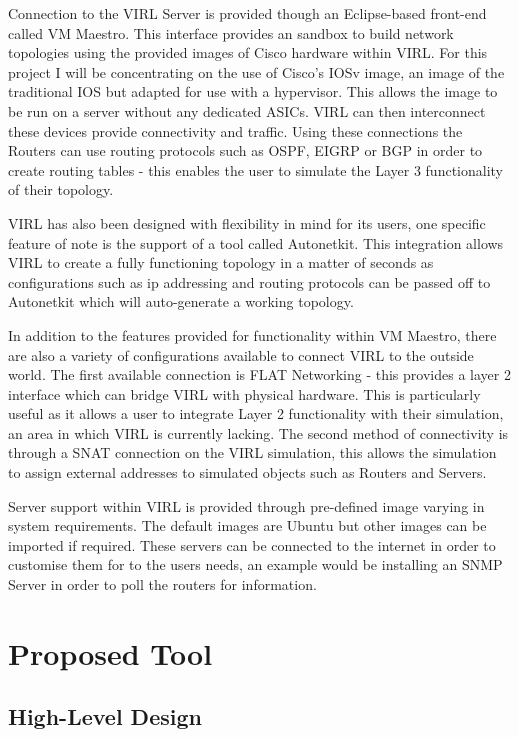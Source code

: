 \documentclass[11pt]{report}
\begin{document}
Connection to the VIRL Server is provided though an Eclipse-based front-end called VM Maestro. This interface provides an sandbox to build network topologies using the provided images of Cisco hardware within VIRL. For this project I will be concentrating on the use of Cisco's IOSv image, an image of the traditional IOS but adapted for use with a hypervisor. This allows the image to be run on a server without any dedicated ASICs. VIRL can then interconnect these devices provide connectivity and traffic. Using these connections the Routers can use routing protocols such as OSPF, EIGRP or BGP in order to create routing tables - this enables the user to simulate the Layer 3 functionality of their topology.

VIRL has also been designed with flexibility in mind for its users, one specific feature of note is the support of a tool called Autonetkit. This integration allows VIRL to create a fully functioning topology in a matter of seconds as configurations such as ip addressing and routing protocols can be passed off to Autonetkit which will auto-generate a working topology.

In addition to the features provided for functionality within VM Maestro, there are also a variety of configurations available to connect VIRL to the outside world. The first available connection is FLAT Networking - this provides a layer 2 interface which can bridge VIRL with physical hardware. This is particularly useful as it allows a user to integrate Layer 2 functionality with their simulation, an area in which VIRL is currently lacking. The second method of connectivity is through a SNAT connection on the VIRL simulation, this allows the simulation to assign external addresses to simulated objects such as Routers and Servers.

Server support within VIRL is provided through pre-defined image varying in system requirements. The default images are Ubuntu but other images can be imported if required. These servers can be connected to the internet in order to customise them for to the users needs, an example would be installing an SNMP Server in order to poll the routers for information.

\chapter{Proposed Tool}

\section{High-Level Design}
\end{document}
